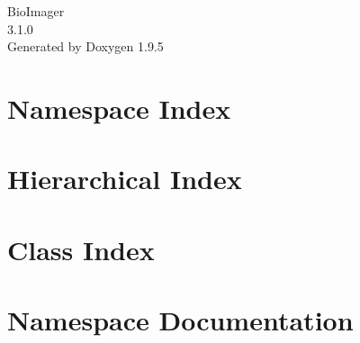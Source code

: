 \documentclass[twoside]{book}
\newcommand{\+}{\discretionary{\mbox{\scriptsize$\hookleftarrow$}}{}{}}
\newcommand{\clearemptydoublepage}{%
    \newpage{\pagestyle{empty}\cleardoublepage}%
  }
\begin{document}
  \raggedbottom
    \hypersetup{pageanchor=false,
                bookmarksnumbered=true,
                pdfencoding=unicode
               }
  \begin{titlepage}
  \vspace*{7cm}
  \begin{center}%
  {\Large Bio\+Imager}\\
  [1ex]\large 3.\+1.\+0 \\
  \vspace*{1cm}
  {\large Generated by Doxygen 1.9.5}\\
  \end{center}
  \end{titlepage}
  \clearemptydoublepage
  \tableofcontents
  \clearemptydoublepage
  \hypersetup{pageanchor=true}
\chapter{Namespace Index}

\chapter{Hierarchical Index}

\chapter{Class Index}

\chapter{Namespace Documentation}




\end{document}
